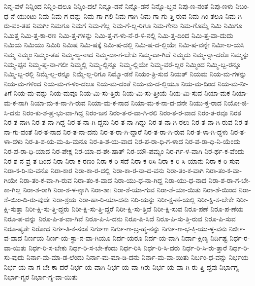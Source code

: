 {ನಿನ್ನ-ವಳೆ
ನಿನ್ನಿಂದ
ನಿನ್ನಿಂ-ದಲೂ
ನಿನ್ನಿಂ-ದಲೆ
ನಿನ್ನೂ-ಡನೆ
ನಿನ್ನೊ-ಡನೆ
ನಿನ್ನೊ-ಬ್ಬನ
ನಿಪು-ಣ-ನಂತೆ
ನಿಪು-ಣಳು
ನಿಬಂ-ಧ-ನೆ-ಯುಂಟು
ನಿಮ
ನಿಮ-ಗ-ದನ್ನು
ನಿಮ-ಗಾ-ಗಲಿ
ನಿಮ-ಗಾಗಿ
ನಿಮ-ಗಾ-ಗು-ತ್ತಿ-ರುವ
ನಿಮ-ಗಿಂ-ತಲೂ
ನಿಮ-ಗಿ-ರು-ವಂ-ತಹ
ನಿಮಗೀ
ನಿಮಗೂ
ನಿಮಗೆ
ನಿಮ-ಗೆಲ್ಲ
ನಿಮ-ಗೆ-ಲ್ಲ-ರಿಗೂ
ನಿಮ-ಗೇನು
ನಿಮ-ಗೊಮ್ಮೆ
ನಿಮಿ
ನಿಮಿಗೂ
ನಿಮಿತ್ತ
ನಿಮಿ-ತ್ತ-ಕಾ-ರಣ
ನಿಮಿ-ತ್ತ-ಗಳನ್ನು
ನಿಮಿ-ತ್ತ-ಗ-ಳು-ನೆ-ರ-ಳಿ-ನಲ್ಲಿ
ನಿಮಿ-ತ್ತ-ದಿಂದ
ನಿಮಿ-ತ್ತ-ವಾ-ದುದು
ನಿಮಿಯ
ನಿಮಿಯು
ನಿಮಿರಿ
ನಿಮಿಷ
ನಿಮಿ-ಷಕ್ಕೆ
ನಿಮಿ-ಷ-ದಲ್ಲಿ
ನಿಮಿ-ಷ-ದ-ಲ್ಲಿಯೇ
ನಿಮಿ-ಷ-ವನ್ನೇ
ನಿಮೀ-ಲ-ಯಸಿ
ನಿಮ್ಮ
ನಿಮ್ಮಂ
ನಿಮ್ಮಂ-ತಹ
ನಿಮ್ಮ-ಜ್ಜ-ನಾದ
ನಿಮ್ಮ-ದಾ-ಗ-ಬೇಕು
ನಿಮ್ಮ-ದಾ-ಗಿದೆ
ನಿಮ್ಮದು
ನಿಮ್ಮ-ನ್ನಾ-ದರೊ
ನಿಮ್ಮನ್ನು
ನಿಮ್ಮ-ಪ್ಪನ
ನಿಮ್ಮ-ಪ್ಪ-ನಾ-ಗಲೀ
ನಿಮ್ಮಲ್ಲಿ
ನಿಮ್ಮ-ಲ್ಲಿನ್ನೂ
ನಿಮ್ಮ-ಲ್ಲಿಯೇ
ನಿಮ್ಮ-ವರೆ-ಲ್ಲರ
ನಿಮ್ಮಿಂದ
ನಿಮ್ಮಿ-ಬ್ಬ-ರನ್ನೂ
ನಿಮ್ಮಿ-ಬ್ಬ-ರಲ್ಲಿ
ನಿಮ್ಮೆ-ಲ್ಲ-ರನ್ನೂ
ನಿಮ್ಮೆ-ಲ್ಲ-ರಿಗೂ
ನಿಮ್ಮೊ-ಡನೆ
ನಿಯಂ-ತ್ರಿ-ಸುವ
ನಿಯತ್
ನಿಯಮ
ನಿಯ-ಮ-ಗಳನ್ನು
ನಿಯ-ಮ-ಗಳಿಂದ
ನಿಯ-ಮ-ಗ-ಳಿಂ-ದಲೂ
ನಿಯ-ಮ-ದಂತೆ
ನಿಯ-ಮ-ದ-ಲ್ಲಿಯೂ
ನಿಯ-ಮ-ದಿಂದ
ನಿಯ-ಮ-ನೀ-ತಿಗೆ
ನಿಯ-ಮ-ವನ್ನು
ನಿಯ-ಮವೂ
ನಿಯ-ಮಿ-ಸು-ತ್ತಿರು
ನಿಯ-ಮಿ-ಸು-ತ್ತೀಯೆ
ನಿಯ-ಮಿ-ಸುವ
ನಿಯಾ-ಮಕ
ನಿಯಾ-ಮ-ಕ-ನಾಗಿ
ನಿಯಾ-ಮ-ಕ-ನಾ-ಗಿ-ರುವ
ನಿಯಾ-ಮ-ಕ-ನಾದ
ನಿಯಾ-ಮ-ಕ-ನಾ-ದ-ವನೇ
ನಿಯು-ಕ್ತ-ರಾದ
ನಿಯೋ-ಜಿ-ಸಿ-ದನು
ನಿರಂ-ಕು-ಶ-ಪ್ರ-ಭು-ವಾ-ಗಿದ್ದ
ನಿರಂ-ಜನ
ನಿರಂ-ತ-ರ-ವಾ-ಗಿ-ರಲಿ
ನಿರಂ-ತ-ರ-ವಾದ
ನಿರಂ-ತ-ರವೂ
ನಿರತ
ನಿರ-ತ-ನಾಗಿ
ನಿರ-ತ-ನಾ-ಗಿದ್ದ
ನಿರ-ತ-ನಾ-ಗಿ-ದ್ದನು
ನಿರ-ತ-ನಾ-ಗಿದ್ದು
ನಿರ-ತ-ನಾ-ಗಿ-ರಲು
ನಿರ-ತ-ನಾ-ಗಿ-ರುವ
ನಿರ-ತ-ನಾ-ಗು-ವಂತೆ
ನಿರ-ತ-ನಾದ
ನಿರ-ತ-ನಾ-ದನು
ನಿರ-ತ-ರಾ-ಗಿ-ದ್ದಾರೆ
ನಿರ-ತ-ರಾ-ಗಿ-ರುವ
ನಿರ-ತ-ಳಾ-ಗಿ-ದ್ದಳು
ನಿರ-ತ-ಳಾ-ದಳು
ನಿರ-ತಿ-ಶ-ಯ-ಮ-ಹಿ-ಮನೂ
ನಿರ-ತಿ-ಶ-ಯ-ವಾದ
ನಿರ-ಪ-ರಾ-ಧಿ-ಗ-ಳಾದ
ನಿರ-ಪ-ರಾ-ಧಿ-ನಿ-ಯೆಂದು
ನಿರ-ಪ-ರಾ-ಧಿ-ಯಾದ
ನಿರ-ಪೇಕ್ಷ
ನಿರ-ಯಾ-ದ-ಶೇ-ಷಾತ್
ನಿರ-ಯೌ-ಪಮ್ಯಂ
ನಿರ-ರ್ಗ-ಳ-ವಾಗಿ
ನಿರ-ರ್ಥ-ಕ-ವೆಂದು
ನಿರ-ಶ-ನ-ವ್ರ-ತ-ದಿಂದ
ನಿರಾ
ನಿರಾ-ಕ-ರಣಂ
ನಿರಾ-ಕ-ರಿ-ಸದೆ
ನಿರಾ-ಕ-ರಿಸಿ
ನಿರಾ-ಕ-ರಿ-ಸಿ-ಯಾನು
ನಿರಾ-ಕ-ರಿ-ಸುವ
ನಿರಾ-ಕ-ರಿ-ಸು-ವನೊ
ನಿರಾ-ಕಾರ
ನಿರಾ-ಕಾ-ರ-ದಲ್ಲಿ
ನಿರಾ-ಕಾ-ರ-ನಾ-ದ-ವನು
ನಿರಾ-ತಂ-ಕ-ವಾಗಿ
ನಿರಾ-ತಂ-ಕ-ವಾ-ಗಿಯೇ
ನಿರಾ-ತಂ-ಕ-ವಾ-ಗಿ-ರುವ
ನಿರಾ-ತಂ-ಕ-ವಾದ
ನಿರಾ-ಯು-ಧ-ನಾ-ಗಿದ್ದ
ನಿರಾ-ಯು-ಧ-ನಾದ
ನಿರಾ-ಶ-ರಾ-ಗ-ಬೇ-ಕಾ-ಗಿಲ್ಲ
ನಿರಾ-ಶ-ರಾಗಿ
ನಿರಾ-ಶ-ಳ-ನ್ನಾಗಿ
ನಿರಾ-ಶಾಃ
ನಿರಾ-ಶೆ-ಯಾ-ಗುವ
ನಿರಾ-ಶೆ-ಯಾ-ಯಿತು
ನಿರಾ-ಶೆ-ಯಿಂದ
ನಿರಾ-ಶೆ-ಯಿಂ-ದಿ-ರು-ವುದೇ
ನಿರಾ-ಶ್ರಯ
ನಿರಾ-ಹಾ-ರಿ-ಯಾ-ದನು
ನಿರಿ-ಯನ್ನು
ನಿರೀ-ಕ್ಷ-ಣೆ-ಯಲ್ಲಿ
ನಿರೀ-ಕ್ಷಿ-ಸ-ಬೇಕೇ
ನಿರೀ-ಕ್ಷಿ-ಸುತ್ತಾ
ನಿರೀ-ಕ್ಷಿ-ಸು-ತ್ತಿ-ದ್ದರು
ನಿರೀ-ಕ್ಷಿ-ಸು-ತ್ತಿ-ದ್ದರೆ
ನಿರೀ-ಕ್ಷಿ-ಸು-ತ್ತಿವೆ
ನಿರೀ-ಕ್ಷಿ-ಸುವ
ನಿರೂ-ಪಣೆ
ನಿರೂ-ಪ-ಣೆಯ
ನಿರೂ-ಪ-ವನ್ನು
ನಿರೂ-ಪಿ-ತ-ವಾ-ಗಿವೆ
ನಿರೂ-ಪಿ-ಸಿ-ದನು
ನಿರೂ-ಪಿ-ಸಿದೆ
ನಿರೂ-ಪಿ-ಸು-ತ್ತಿ-ರುವ
ನಿರೂ-ಪಿ-ಸುವ
ನಿರೂ-ಪ್ಯತೇ
ನಿರೋಧ
ನಿರ್ಗ-ತಿ-ಕ-ನಂತೆ
ನಿರ್ಗುಣ
ನಿರ್ಗು-ಣ-ಬ್ರ-ಹ್ಮ-ನನ್ನು
ನಿರ್ಗು-ಣ-ಭ-ಕ್ತಿ-ಯು-ಳ್ಳ-ವನು
ನಿರ್ಜೀ-ವ-ವಾದ
ನಿರ್ಣಯ
ನಿರ್ಣ-ಯ-ಸ್ಥಾ-ನ-ವಾ-ಗಿಯೂ
ನಿರ್ದ-ಯರೂ
ನಿರ್ದ-ಯ-ವಾಗಿ
ನಿರ್ದಾ-ಕ್ಷಿಣ್ಯ
ನಿರ್ದಿಷ್ಟ
ನಿರ್ಧ-ರ-ವಾ-ಯಿತು
ನಿರ್ಧ-ರಿ-ಸ-ಬೇಕು
ನಿರ್ಧ-ರಿ-ಸ-ಬೇ-ಕೆಂದು
ನಿರ್ಧ-ರಿಸಿ
ನಿರ್ಧ-ರಿ-ಸಿ-ದರು
ನಿರ್ಧ-ರಿ-ಸಿ-ರು-ತ್ತಾರೆ
ನಿರ್ಧ-ರಿ-ಸು-ವುದು
ನಿರ್ನಾ-ಮ-ಮಾ-ಡ-ಲೆಂದು
ನಿರ್ನಾ-ಮ-ಮಾ-ಡಿ-ದನು
ನಿರ್ನಾ-ಮ-ವಾ-ಯಿತು
ನಿರ್ಬಂ-ಧ-ವನ್ನು
ನಿರ್ಭಯ
ನಿರ್ಭ-ಯ-ನಾ-ಗ-ಬೇ-ಕಾ-ದರೆ
ನಿರ್ಭ-ಯ-ವಾಗಿ
ನಿರ್ಭ-ಯ-ವಾ-ಗಿರು
ನಿರ್ಭ-ಯ-ವಾ-ಗಿ-ರು-ತ್ತಿ-ದ್ದವು
ನಿರ್ಭಾಗ್ಯ
ನಿರ್ಭಾ-ಗ್ಯರ
ನಿರ್ಭಾ-ಗ್ಯ-ವಾ-ಯಿತು
}
